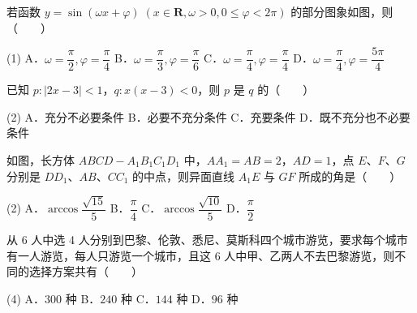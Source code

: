 \begin{question}
若函数 $y = \sin(\omega x + \varphi) \; (x \in \mathbf{R}, \omega > 0, 0 \leqslant \varphi < 2\pi)$ 的部分图象如图，则\mbox{（　　）}
\nopagebreak[4]
\begin{center}\end{center}
\nopagebreak[4]
\begin{gkopts}(1)
\task A．$\omega = \dfrac{\pi}{2}, \varphi = \dfrac{\pi}{4}$
\task B．$\omega = \dfrac{\pi}{3}, \varphi = \dfrac{\pi}{6}$
\task C．$\omega = \dfrac{\pi}{4}, \varphi = \dfrac{\pi}{4}$
\task D．$\omega = \dfrac{\pi}{4}, \varphi = \dfrac{5\pi}{4}$
\end{gkopts}

\end{question}
\begin{question}
已知 $p: |2x - 3| < 1$，$q: x(x - 3) < 0$，则 $p$ 是 $q$ 的\mbox{（　　）}

\begin{gkopts}(2)
\task A．充分不必要条件
\task B．必要不充分条件
\task C．充要条件
\task D．既不充分也不必要条件
\end{gkopts}

\Needspace{0.4\textheight}
\end{question}
\begin{question}
如图，长方体 $ABCD - A_1B_1C_1D_1$ 中，$AA_1 = AB = 2$，$AD = 1$，点 $E$、$F$、$G$ 分别是 $DD_1$、$AB$、$CC_1$ 的中点，则异面直线 $A_1E$ 与 $GF$ 所成的角是\mbox{（　　）}
\nopagebreak[4]
\begin{center}\end{center}
\nopagebreak[4]
\begin{gkopts}(2)
\task A．$\arccos\dfrac{\sqrt{15}}{5}$
\task B．$\dfrac{\pi}{4}$
\task C．$\arccos\dfrac{\sqrt{10}}{5}$
\task D．$\dfrac{\pi}{2}$
\end{gkopts}

\end{question}
\begin{question}
从 6 人中选 4 人分别到巴黎、伦敦、悉尼、莫斯科四个城市游览，要求每个城市有一人游览，每人只游览一个城市，且这 6 人中甲、乙两人不去巴黎游览，则不同的选择方案共有\mbox{（　　）}

\begin{gkopts}(4)
\task A．$300$ 种
\task B．$240$ 种
\task C．$144$ 种
\task D．$96$ 种
\end{gkopts}

\end{question}
